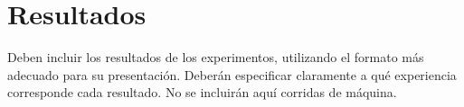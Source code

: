 \section{Resultados}

  {\color{Gray} Deben incluir los resultados de los experimentos, utilizando el formato más adecuado para su presentación. Deberán especificar claramente a qué experiencia corresponde cada resultado. No se incluirán aquí corridas de máquina.}
